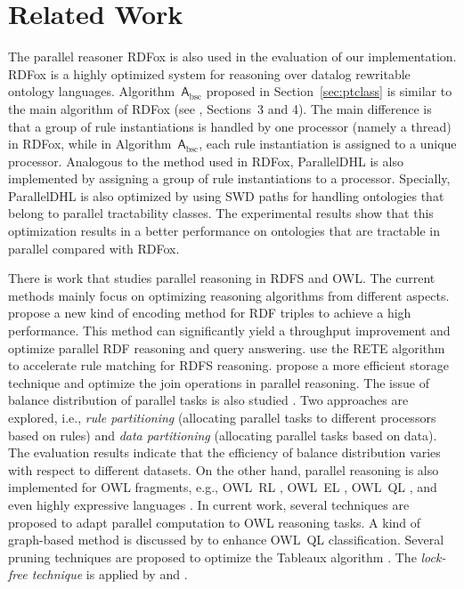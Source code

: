 \section{Related Work}
\label{sec:related}

The parallel reasoner RDFox \cite{MotikNPHO14} is also used in the evaluation of our implementation. RDFox is a highly optimized system for reasoning over datalog rewritable ontology languages. Algorithm~$\mathsf{A}_{\text{bsc}}$ proposed in Section~\ref{sec:ptclass} is similar to the main algorithm of RDFox (see \cite{MotikNPHO14}, Sections~3 and 4). The main difference is that a group of rule instantiations is handled by one processor (namely a thread) in RDFox, while in Algorithm~$\mathsf{A}_{\text{bsc}}$, each rule instantiation is assigned to a unique processor.
Analogous to the method used in RDFox, ParallelDHL is also implemented by assigning a group of
rule instantiations to a processor.
Specially, ParallelDHL is also optimized by using SWD paths for handling
ontologies that belong to parallel tractability classes.
The experimental results show that this optimization results in a
better performance on ontologies that are
tractable in parallel compared with RDFox.

There is work that studies parallel reasoning in RDFS and OWL. The current methods mainly focus on optimizing reasoning algorithms from different aspects. \citet{GoodmanJMAAH11} propose a new kind of encoding method for RDF triples to achieve a high performance. This method can significantly yield a throughput improvement and optimize parallel RDF reasoning and query answering. \citet{PetersSZ15} use the RETE algorithm to accelerate rule matching for RDFS reasoning. \citet{SubercazeGCL16} propose a more efficient storage technique and optimize the join operations in parallel reasoning. The issue of balance distribution of parallel tasks is also studied \cite{SomaP08,WeaverH09}. Two approaches are explored, i.e., \emph{rule partitioning} (allocating parallel tasks to different processors based on rules) and \emph{data partitioning} (allocating parallel tasks based on data). The evaluation results indicate that the efficiency of balance distribution varies with respect to different datasets. On the other hand, parallel reasoning is also implemented for OWL fragments, e.g., OWL~RL \cite{KolovskiWE10}, OWL~EL \cite{KazakovKS14}, OWL~QL \cite{LemboSS13}, and even highly expressive languages \cite{SteigmillerLG14,LiebigM07,SchlichtS08,WuH12}. In current work, several techniques are proposed to adapt parallel computation to OWL reasoning tasks. A kind of graph-based method is discussed by \citet{LemboSS13} to enhance OWL~QL classification.  Several pruning techniques are proposed to optimize the Tableaux algorithm \cite{LiebigM07,SchlichtS08,WuH12}. The \emph{lock-free technique} is applied by \citet{KazakovKS14} and \citet{SteigmillerLG14}.

